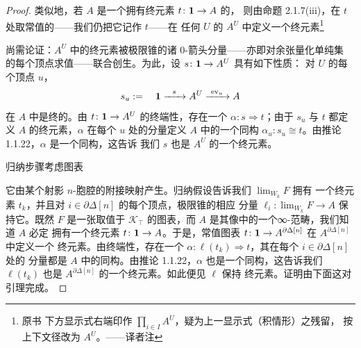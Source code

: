\begin{proof}
类似地，若 $A$ 是一个拥有终元素 $t\colon\mathbf{1}\to A$ 的\trInfinityCategory{}，
则由命题 2.1.7(iii)，在 $t$ 处取常值的\trDiagram——我们仍把它记作 $t$——在
任何\trSimplicialSet{} $U$ 的\trCotensor{} $A^{U}$ 中定义一个终元素\footnote{原书
下方显示式右端印作 $\prod_{i\in I}A^{U}$，疑为上一显示式（积情形）之残留，
按上下文径改为 $A^{U}$。——译者注}
\begin{center}
\end{center}
尚需论证：$A^{U}$ 中的终元素被极限锥的诸 0-箭头分量——亦即对余张量化单纯集
的每个顶点求值——联合创生。为此，设 $s\colon\mathbf{1}\to A^{U}$ 具有如下性质：
对 $U$ 的每个顶点 $u$，
\[
s_{u}:=\quad
\qcOne\xrightarrow{\ \ s\ \ }A^{U}\xrightarrow{\ \mathrm{ev}_{u}\ }A
\]
在 $A$ 中是终的。由 $t\colon\mathbf{1}\to A^{U}$ 的终端性，存在一个%
\trNaturalTransformation{} $\alpha\colon s\Rightarrow t$；由于 $s_{u}$ 与 $t$
都定义 $A$ 的终元素，$\alpha$ 在每个 $u$ 处的分量定义 $A$ 中的一个同构
$\alpha_{u}\colon s_{u}\cong t$。由推论 1.1.22，$\alpha$ 是一个同构，这告诉
我们 $s$ 也是 $A^{U}$ 的一个终元素。

归纳步骤考虑\trPullback{}图表
\begin{center}
\end{center}
它由某个射影 $n$-胞腔的附接映射产生。归纳假设告诉我们 $\lim_{W_{k}}F$ 拥有
一个终元素 $t_{k}$，并且对 $i\in\partial\Delta[n]$ 的每个顶点，极限锥的相应
分量 $\ell_{i}\colon\lim_{W_{k}}F\to A$ 保持它。既然 $F$ 是一张取值于
$\mathcal{K}_{\top}$ 的图表，而 $A$ 是其像中的一个∞-范畴，我们知道 $A$ 必定
拥有一个终元素 $t\colon\mathbf{1}\to A$。于是，常值图表
$t\colon\mathbf{1}\to A^{\partial\Delta[n]}$ 在 $A^{\partial\Delta[n]}$ 中定义一个
终元素。由终端性，存在一个\trNaturalTransformation{}
$\alpha\colon\ell(t_{k})\Rightarrow t$，其在每个 $i\in\partial\Delta[n]$ 处的
分量都是 $A$ 中的同构。由推论 1.1.22，$\alpha$ 也是一个同构，这告诉我们
$\ell(t_{k})$ 也是 $A^{\partial\Delta[n]}$ 的一个终元素。如此便见 $\ell$ 保持
终元素。证明由下面这对引理完成。
\end{proof}

